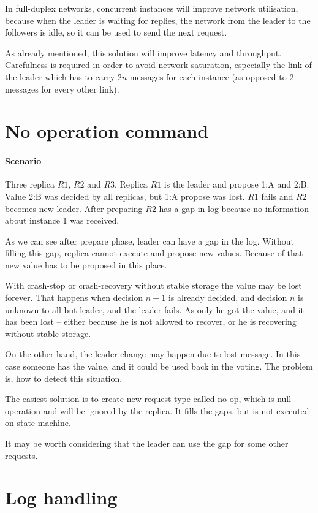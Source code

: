 In full-duplex networks, concurrent instances will improve network utilisation, because when the leader is waiting for replies, the network from the leader to the followers is idle, so it can be used to send the next request. 

As already mentioned, this solution will improve latency and throughput. Carefulness is required in order to avoid network saturation, especially the link of the leader which has to carry $2n$ messages for each instance (as opposed to 2 messages for every other link).

\section{No operation command}
\paragraph{Scenario}
Three replica $R1$, $R2$ and $R3$. Replica $R1$ is the leader and propose {1:A} and {2:B}. Value {2:B} was decided by all replicas, but {1:A} propose was lost. $R1$ fails and $R2$ becomes new leader. After preparing $R2$ has a gap in log because no information about instance 1 was received. 

As we can see after prepare phase, leader can have a gap in the log. Without filling this gap, replica cannot execute and propose new values. Because of that new value has to be proposed in this place.

With crash-stop or crash-recovery without stable storage the value may be lost forever. That happens when decision $n+1$ is already decided, and decision $n$ is unknown to all but leader, and the leader fails. As only he got the value, and it has been lost -- either because he is not allowed to recover, or he is recovering without stable storage.

On the other hand, the leader change may happen due to lost \alive message. In this case someone has the value, and it could be used back in the voting. The problem is, how to detect this situation.

The easiest solution is to create new request type called no-op, which is null operation and will be ignored by the replica. It fills the gaps, but is not executed on state machine.

It may be worth considering that the leader can use the gap for some other requests. 

\section{Log handling}

